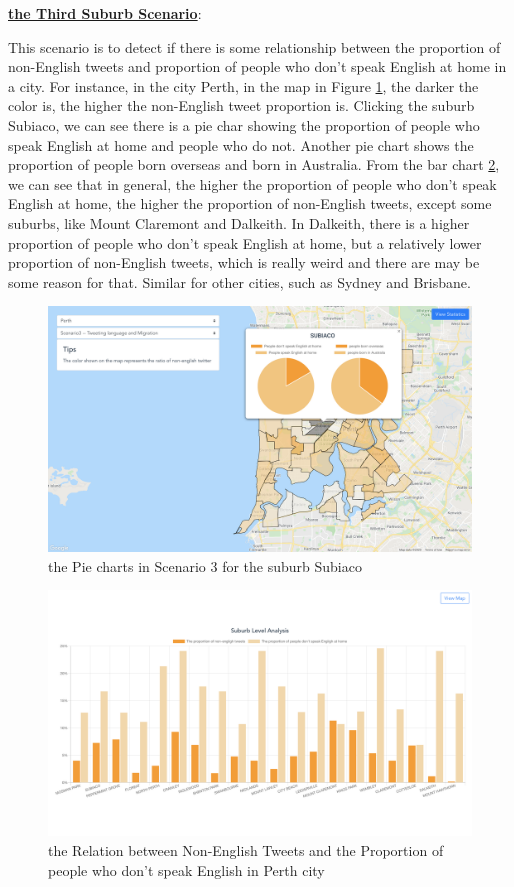 \documentclass{article}
\begin{document}
\textbf{\underline{the Third Suburb Scenario}}: 

This scenario is to detect if there is some relationship between the proportion  of non-English tweets and proportion of people who don't speak English at home in a city. For instance, in the city Perth, in the map in Figure 
\ref{fig:Perth_pie_chart}, the darker the color is, the higher the non-English tweet proportion is. Clicking the suburb Subiaco, we can see there is a pie char showing the proportion of people who speak English at home and people who do not. Another pie chart shows the proportion of people born overseas and born in Australia. From the bar chart
\ref{fig:Perth_histogram}, we can see that in general, the higher the proportion of people who don’t speak English at home, the higher the proportion of non-English tweets, except some suburbs, like Mount Claremont and Dalkeith. In Dalkeith, there is a higher proportion of people who don’t speak English at home, but a relatively lower proportion of non-English tweets, which is really weird and there are may be some reason for that. Similar for other cities, such as Sydney and Brisbane.

\begin{figure}[htp]
\centering
\includegraphics[width=\textwidth]{img/Perth_pie_chart.jpg}
\caption{the Pie charts in Scenario 3 for the suburb Subiaco}
\label{fig:Perth_pie_chart}
\end{figure}

\begin{figure}[htp]
\centering
\includegraphics[width=\textwidth]{img/Perth_histogram.jpg}
\caption{the Relation between Non-English Tweets and the Proportion of people who don't speak English in Perth city}
\label{fig:Perth_histogram}
\end{figure}
\end{document}
